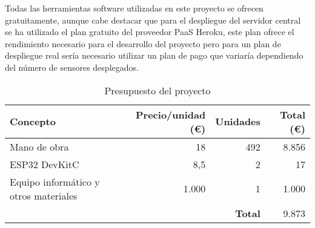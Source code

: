 \documentclass[../proyecto.tex]{subfiles}
\begin{document}
Todas las herramientas software utilizadas en este proyecto se ofrecen gratuitamente, aunque cabe destacar que para el despliegue del servidor central se ha utilizado el plan gratuito del proveedor PaaS Heroku, este plan ofrece el rendimiento necesario para el desarrollo del proyecto pero para un plan de despliegue real sería necesario utilizar un plan de pago que variaría dependiendo del número de sensores desplegados.\\

\begin{table}[H]
\centering
\begin{tabular}{ |l|r|r|r| }
\hline
\textbf{Concepto} & \textbf{Precio/unidad (€)} & \textbf{Unidades} & \textbf{Total (€)}\\
\hline\hline
Mano de obra  & 18  &  492  & 8.856   \\ \hline
ESP32 DevKitC  & 8,5  & 2 & 17\\ \hline
Equipo informático y otros materiales & 1.000 & 1 & 1.000 \\ \hline
 &  & \textbf{Total} & 9.873\\ \hline
\end{tabular}
\caption{Presupuesto del proyecto}
\label{table:presupuesto_proyecto}
\end{table}
\end{document}
